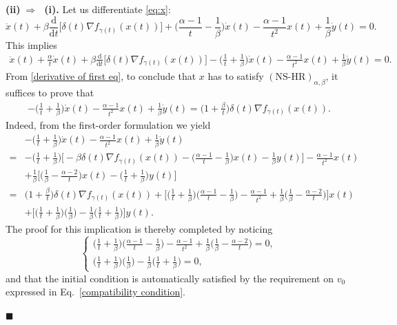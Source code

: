 \documentclass[11pt]{article}
\numberwithin{equation}{section}
\newenvironment{proof}{\bigskip\noindent{\bf Proof.}}{\hfill $\blacksquare$ \par\bigskip\noindent}
\begin{document}
\begin{proof}
\noindent\textbf{(ii)$\;\Rightarrow\;$ (i).}
Let us differentiate \eqref{eq:x}:
\[
\ddot{x}(t)+\beta\frac{\mathrm{d}}{\mathrm{d}t}\Big[\delta(t)\nabla f_{\gamma(t)}(x(t))\Big]+\Big(\frac{\alpha-1}{t}-\frac{1}{\beta}\Big)\dot{x}(t)-\frac{\alpha-1}{t^2}x(t)+\frac{1}{\beta}\dot{y}(t)=0.
\]
This implies 
\begin{align}
\label{derivative of first eq}
    \ddot{x}(t)+\frac{\alpha}{t}\dot{x}(t)+\beta\frac{\mathrm{d}}{\mathrm{d}t}\Big[\delta(t)\nabla f_{\gamma(t)}(x(t))\Big]-\Big(\frac{1}{t}+\frac{1}{\beta}\Big)\dot{x}(t)-\frac{\alpha-1}{t^2}x(t)+\frac{1}{\beta}\dot{y}(t)=0.
\end{align}
From \eqref{derivative of first eq}, to conclude that $x$ has to satisfy $(\text{NS-HR})_{\alpha,\beta}$, it suffices to prove that
\begin{align*}
-\Big(\frac{1}{t}+\frac{1}{\beta}\Big)\dot{x}(t)-\frac{\alpha-1}{t^2}x(t)+\frac{1}{\beta}\dot{y}(t)=\Big(1+\frac{\beta}{t}\Big)\delta(t)\nabla f_{\gamma(t)}(x(t)). 
\end{align*}
Indeed, from the first-order formulation we yield 
\begin{align*}
&-\Big(\frac{1}{t}+\frac{1}{\beta}\Big)\dot{x}(t)-\frac{\alpha-1}{t^2}x(t)+\frac{1}{\beta}\dot{y}(t) \\
=&-\Big(\frac{1}{t}+\frac{1}{\beta}\Big)\Big[-\beta\delta(t)\nabla f_{\gamma(t)}(x(t))-\Big(\frac{\alpha-1}{t}-\frac{1}{\beta}\Big)x(t)-\frac{1}{\beta}y(t)\Big]-\frac{\alpha-1}{t^2}x(t) \\
&+\frac{1}{\beta}\Big[\Big(\frac{1}{\beta}-\frac{\alpha-2}{t}\Big)x(t)-\Big(\frac{1}{t}+\frac{1}{\beta}\Big)y(t)\Big] \\
=&\Big(1+\frac{\beta}{t}\Big)\delta(t)\nabla f_{\gamma(t)}(x(t)) +\Big[\Big(\frac{1}{t}+\frac{1}{\beta}\Big)\Big(\frac{\alpha-1}{t}-\frac{1}{\beta}\Big)-\frac{\alpha-1}{t^2}+\frac{1}{\beta}\Big(\frac{1}{\beta}-\frac{\alpha-2}{t}\Big)\Big]x(t)\\
&+\Big[\Big(\frac{1}{t}+\frac{1}{\beta}\Big)\Big(\frac{1}{\beta}\Big)-\frac{1}{\beta}\Big(\frac{1}{t}+\frac{1}{\beta}\Big)\Big]y(t). 
\end{align*}
The proof for this implication is thereby completed by noticing 
$$
\begin{cases}
    \Big(\frac{1}{t}+\frac{1}{\beta}\Big)\Big(\frac{\alpha-1}{t}-\frac{1}{\beta}\Big)-\frac{\alpha-1}{t^2}+\frac{1}{\beta}\Big(\frac{1}{\beta}-\frac{\alpha-2}{t}\Big)=0, \\
    \Big(\frac{1}{t}+\frac{1}{\beta}\Big)\Big(\frac{1}{\beta}\Big)-\frac{1}{\beta}\Big(\frac{1}{t}+\frac{1}{\beta}\Big)=0,
\end{cases}
$$
and that the initial condition is automatically satisfied by the requirement on $v_0$ expressed in Eq.~\eqref{compatibility condition}. 


\end{proof}
\end{document}
